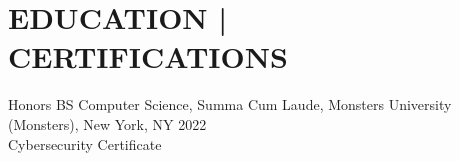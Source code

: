 \section {EDUCATION | CERTIFICATIONS}
\begin{center}
Honors BS Computer Science, Summa Cum Laude, Monsters University (Monsters), New York, NY 2022\\
Cybersecurity Certificate
\end{center}